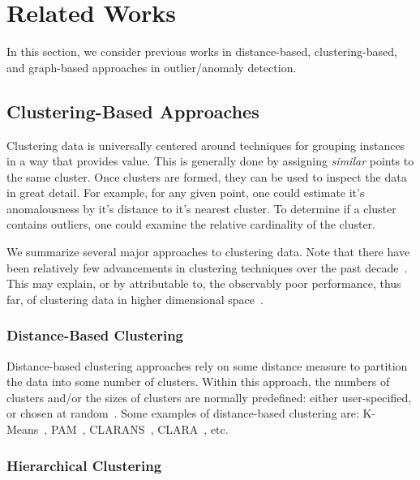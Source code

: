 \section{Related Works}
\label{sec:related_works}

In this section, we consider previous works in distance-based, clustering-based, and graph-based approaches in outlier/anomaly detection.

\subsection{Clustering-Based Approaches}

Clustering data is universally centered around techniques for grouping instances in a way that provides value.
This is generally done by assigning \textit{similar} points to the same cluster.
Once clusters are formed, they can be used to inspect the data in great detail.
For example, for any given point, one could estimate it's anomalousness by it's distance to it's nearest cluster.
To determine if a cluster contains outliers, one could examine the relative cardinality of the cluster.

We summarize several major approaches to clustering data.
Note that there have been relatively few advancements in clustering techniques over the past decade~\cite{wang_progress_2019}. This may explain, or by attributable to, the observably poor performance, thus far, of clustering data in higher dimensional space~\cite{zhang_advancements_2013}.

\subsubsection{Distance-Based Clustering}

Distance-based clustering approaches rely on some distance measure to partition the data into some number of clusters.
Within this approach, the numbers of clusters and/or the sizes of clusters are normally predefined: either user-specified, or chosen at random~\cite{wang_progress_2019}.
Some examples of distance-based clustering are: 
K-Means~\cite{macqueen_methods_nodate}, 
PAM~\cite{kaufman_finding_nodate}, 
CLARANS~\cite{ng_efficient_nodate}, 
CLARA~\cite{kaufman_finding_nodate}, 
etc.

\subsubsection{Hierarchical Clustering}

